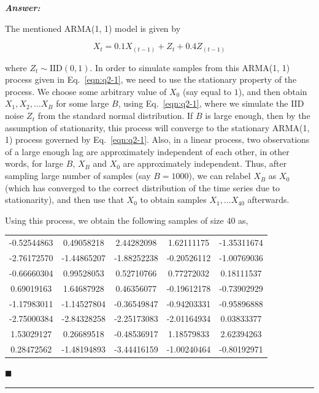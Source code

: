 \documentclass[12pt]{article}
\theoremstyle{definition}
\newenvironment{answer}{
    \textbf{\textit{Answer:}} \qquad
}{\hfill $\blacksquare$ \\ \begin{center}
    \rule{0.6\linewidth}{0.5px}    
\end{center}
}
\begin{document}
\begin{answer}
    The mentioned ARMA(1, 1) model is given by

    \begin{equation}
        X_t = 0.1 X_{(t-1)} + Z_t + 0.4 Z_{(t-1)}
        \label{eqn:q2-1}    
    \end{equation}

    where $Z_t \sim \text{IID}(0, 1)$. In order to simulate samples from this ARMA(1, 1) process given in Eq.~\eqref{eqn:q2-1}, we need to use the stationary property of the process. We choose some arbitrary value of $X_0$ (say equal to $1$), and then obtain $X_1, X_2, \dots X_{B}$ for some large $B$, using Eq.~\eqref{eqn:q2-1}, where we simulate the IID noise $Z_t$ from the standard normal distribution. If $B$ is large enough, then by the assumption of stationarity, this process will converge to the stationary ARMA(1, 1) process governed by Eq.~\eqref{eqn:q2-1}. Also, in a linear process, two observations of a large enough lag are approximately independent of each other, in other words, for large $B$, $X_B$ and $X_0$ are approximately independent. Thus, after sampling large number of samples (say $B = 1000$), we can relabel $X_B$ as $X_0$ (which has converged to the correct distribution of the time series due to stationarity), and then use that $X_0$ to obtain samples $X_1, \dots X_{40}$ afterwards. 

    Using this process, we obtain the following samples of size $40$ as,

    \begin{center}
    \begin{tabular}{ccccc}
        -0.52544863 & 0.49058218 & 2.44282098 & 1.62111175 & -1.35311674\\
         -2.76172570 & -1.44865207 & -1.88252238 & -0.20526112 & -1.00769036 \\
        -0.66660304 & 0.99528053 & 0.52710766 & 0.77272032 & 0.18111537 \\
        0.69019163 & 1.64687928 & 0.46356077 & -0.19612178 & -0.73902929 \\
         -1.17983011 & -1.14527804 & -0.36549847 & -0.94203331 & -0.95896888 \\
         -2.75000384 & -2.84328258 & -2.25173083 & -2.01164934 & 0.03833377 \\
        1.53029127 & 0.26689518 & -0.48536917 & 1.18579833 & 2.62394263 \\
        0.28472562 & -1.48194893 & -3.44416159 & -1.00240464 & -0.80192971\\
    \end{tabular}
    \end{center}


\end{answer}
\end{document}
